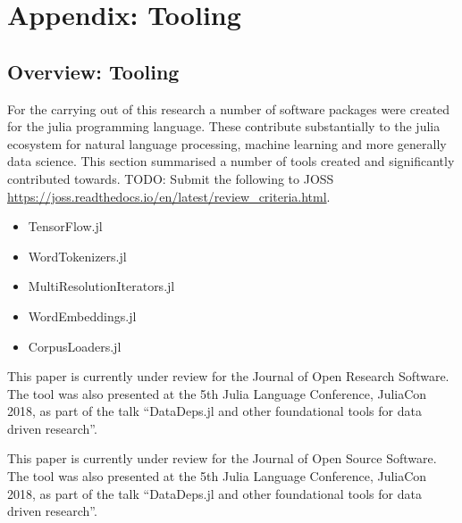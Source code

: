 \documentclass{book}
\begin{document}
	\part{Appendix: Tooling}
	
	\chapter{Overview: Tooling}
	For the carrying out of this research a number of software packages were created for the julia programming language.
	These contribute substantially to the julia ecosystem for natural language processing, machine learning and more generally data science.
	This section summarised a number of tools created and significantly contributed towards.
	TODO: Submit the following to JOSS	\url{https://joss.readthedocs.io/en/latest/review_criteria.html}.
	
	\begin{itemize}
		\item TensorFlow.jl
		\item WordTokenizers.jl
		\item MultiResolutionIterators.jl
		\item WordEmbeddings.jl
		\item CorpusLoaders.jl
	\end{itemize}
	
	
	\begin{preamble}
		This paper is currently under review for the Journal of Open Research Software.
		The tool was also presented at the 5th Julia Language Conference, JuliaCon 2018,
		as part of the talk ``DataDeps.jl and other foundational tools for data driven research''.
	\end{preamble}
	
		
	\begin{preamble}
		This paper is currently under review for the Journal of Open Source Software.
		The tool was also presented at the 5th Julia Language Conference, JuliaCon 2018,
		as part of the talk ``DataDeps.jl and other foundational tools for data driven research''.
	\end{preamble}
	
\end{document}
